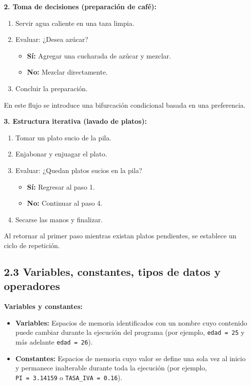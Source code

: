 \textbf{2. Toma de decisiones (preparación de café):}

\begin{enumerate}
\def\labelenumi{\arabic{enumi}.}
\item
  Servir agua caliente en una taza limpia.
\item
  Evaluar: ¿Desea azúcar?

  \begin{itemize}
  \tightlist
  \item
    \textbf{Sí:} Agregar una cucharada de azúcar y mezclar.
  \item
    \textbf{No:} Mezclar directamente.
  \end{itemize}
\item
  Concluir la preparación.
\end{enumerate}

En este flujo se introduce una bifurcación condicional basada en una
preferencia.

\textbf{3. Estructura iterativa (lavado de platos):}

\begin{enumerate}
\def\labelenumi{\arabic{enumi}.}
\item
  Tomar un plato sucio de la pila.
\item
  Enjabonar y enjuagar el plato.
\item
  Evaluar: ¿Quedan platos sucios en la pila?

  \begin{itemize}
  \tightlist
  \item
    \textbf{Sí:} Regresar al paso 1.
  \item
    \textbf{No:} Continuar al paso 4.
  \end{itemize}
\item
  Secarse las manos y finalizar.
\end{enumerate}

Al retornar al primer paso mientras existan platos pendientes, se
establece un ciclo de repetición.

\subsection{2.3 Variables, constantes, tipos de datos y
operadores}\label{variables-constantes-tipos-de-datos-y-operadores}

\textbf{Variables y constantes:}

\begin{itemize}
\tightlist
\item
  \textbf{Variables:} Espacios de memoria identificados con un nombre
  cuyo contenido puede cambiar durante la ejecución del programa (por
  ejemplo, \texttt{edad\ =\ 25} y más adelante \texttt{edad\ =\ 26}).
\item
  \textbf{Constantes:} Espacios de memoria cuyo valor se define una sola
  vez al inicio y permanece inalterable durante toda la ejecución (por
  ejemplo, \texttt{PI\ =\ 3.14159} o \texttt{TASA\_IVA\ =\ 0.16}).
\end{itemize}

